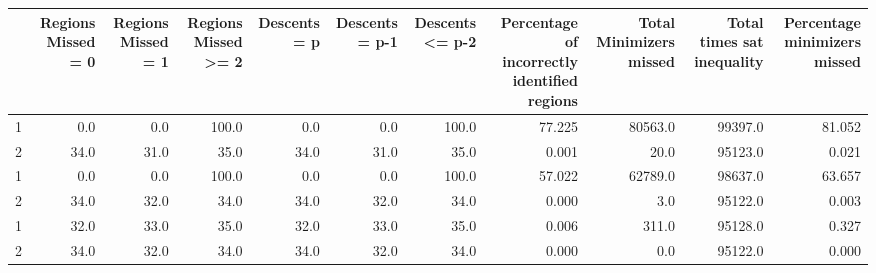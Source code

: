 \begin{tabular}{lrrrrrrrrrr}
\toprule
{} &  Regions Missed = 0 &  Regions Missed = 1 &  Regions Missed >= 2 &  Descents = p &  Descents = p-1 &  Descents <= p-2 &  Percentage of incorrectly identified regions &  Total Minimizers missed &  Total times sat inequality &  Percentage minimizers missed \\
\midrule
1 &                 0.0 &                 0.0 &                100.0 &           0.0 &             0.0 &            100.0 &                                        77.225 &                  80563.0 &                     99397.0 &                        81.052 \\
2 &                34.0 &                31.0 &                 35.0 &          34.0 &            31.0 &             35.0 &                                         0.001 &                     20.0 &                     95123.0 &                         0.021 \\
1 &                 0.0 &                 0.0 &                100.0 &           0.0 &             0.0 &            100.0 &                                        57.022 &                  62789.0 &                     98637.0 &                        63.657 \\
2 &                34.0 &                32.0 &                 34.0 &          34.0 &            32.0 &             34.0 &                                         0.000 &                      3.0 &                     95122.0 &                         0.003 \\
1 &                32.0 &                33.0 &                 35.0 &          32.0 &            33.0 &             35.0 &                                         0.006 &                    311.0 &                     95128.0 &                         0.327 \\
2 &                34.0 &                32.0 &                 34.0 &          34.0 &            32.0 &             34.0 &                                         0.000 &                      0.0 &                     95122.0 &                         0.000 \\
\bottomrule
\end{tabular}
